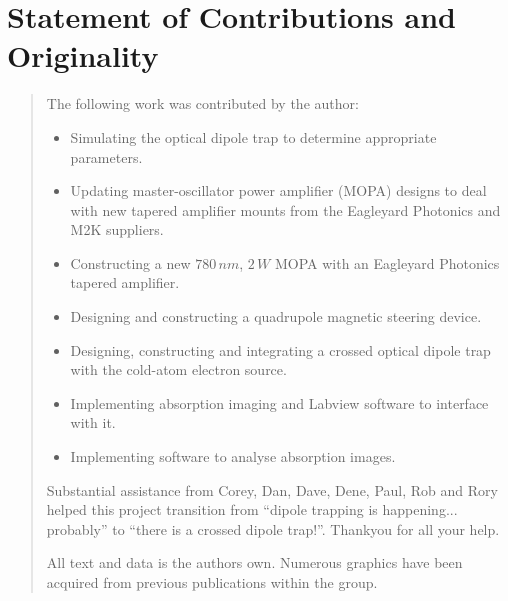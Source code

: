 \chapter*{\centering \LARGE Statement of Contributions and Originality}
\begin{quotation}
\noindent

The following work was contributed by the author:
\begin{itemize}
\item Simulating the optical dipole trap to determine appropriate parameters.
\item Updating master-oscillator power amplifier (MOPA) designs to deal with new tapered amplifier mounts from the Eagleyard Photonics and M2K suppliers.
\item Constructing a new $780\,\unit{nm}$, $2\,\unit{W}$ MOPA with an Eagleyard Photonics tapered amplifier.
\item Designing and constructing a quadrupole magnetic steering device.
\item Designing, constructing and integrating a crossed optical dipole trap with the cold-atom electron source.
\item Implementing absorption imaging and Labview software to interface with it.
\item Implementing software to analyse absorption images.
\end{itemize}

\vspace*{15mm}

Substantial assistance from Corey, Dan, Dave, Dene, Paul, Rob and Rory helped this project transition from ``dipole trapping is happening... probably'' to ``there is a crossed dipole trap!''. Thankyou for all your help.

\vspace*{15mm}

All text and data is the authors own. Numerous graphics have been acquired from previous publications within the group.
\end{quotation}
\clearpage
